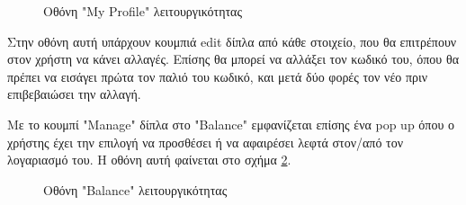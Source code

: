 \documentclass[12pt,a4paper]{article}
\begin{document}
\begin{figure}[H]
	\caption{Οθόνη "My Profile" λειτουργικότητας}
	\label{Οθόνη "My Profile" λειτουργικότητας}
\end{figure}

Στην οθόνη αυτή υπάρχουν κουμπιά edit δίπλα από κάθε στοιχείο, που θα επιτρέπουν στον χρήστη να κάνει αλλαγές. Επίσης θα μπορεί να αλλάξει τον κωδικό του, όπου θα πρέπει να εισάγει πρώτα τον παλιό του κωδικό, και μετά δύο φορές τον νέο πριν επιβεβαιώσει την αλλαγή. 

Με το κουμπί "Manage" δίπλα στο "Balance" εμφανίζεται επίσης ένα pop up όπου ο χρήστης έχει την επιλογή να προσθέσει ή να αφαιρέσει λεφτά στον/από τον λογαριασμό του. Η οθόνη αυτή φαίνεται στο σχήμα \ref{Οθόνη "Balance" λειτουργικότητας}.

\begin{figure}[H]
	\caption{Οθόνη "Balance" λειτουργικότητας}
	\label{Οθόνη "Balance" λειτουργικότητας}
\end{figure}
\end{document}
